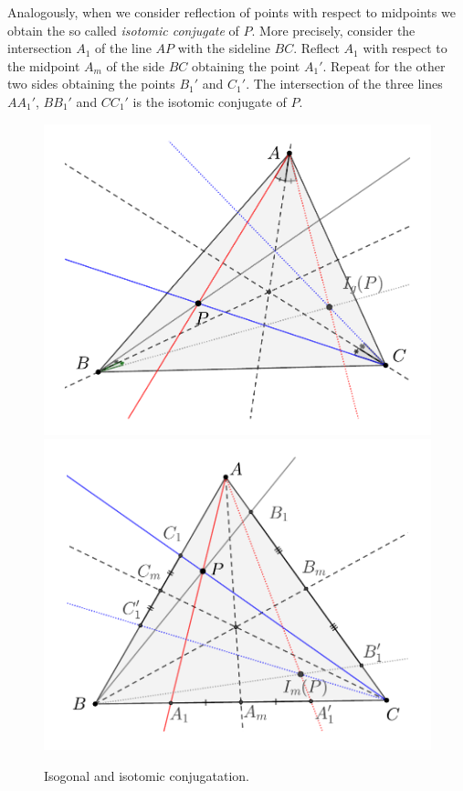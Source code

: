 	Analogously, when we consider reflection of points  with respect to midpoints   we obtain the so called {\em isotomic conjugate} of $P$. More precisely, consider the intersection $A_1$ of the line $AP$ with the sideline $BC$. Reflect $A_1$ with respect to the midpoint $A_m$ of the side $BC$ obtaining the point $A_1'$. Repeat for the other two sides obtaining the points $B_1'$ and $C_1'$. The intersection of the three lines $AA_1'$, $BB_1'$ and $CC_1'$ is the isotomic conjugate of $P$.
	
		\begin{figure}
	    \centering
	    \includegraphics[scale=0.35]{zappA/pics/pics-appA_180-isogonal.pdf}
	     \includegraphics[scale=0.4]{zappA/pics/pics-appA_190-isotomic.pdf}
	    \caption{Isogonal and isotomic conjugatation.}
	    \label{fig:appA-isotomic-isogonal}
	\end{figure}

